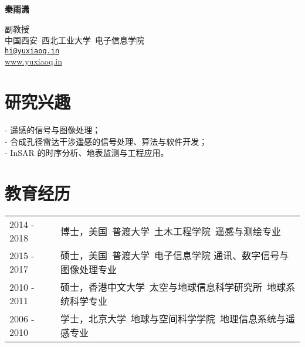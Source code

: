\documentclass[letterpaper]{article}
\def\name{\textbf{秦雨潇}}
\begin{document}
{\huge \name}


\vspace{0.2in}

\begin{minipage}{0.8\linewidth}
	副教授 \\
	中国西安\ 西北工业大学\ 电子信息学院\\
  \href{mailto:hi@yuxiaoq.in}{\tt hi@yuxiaoq.in} \\ 
  \href{www.yuxiaoq.in}{www.yuxiaoq.in}
\end{minipage}


\section*{\textsc{研究兴趣}}
- 遥感的信号与图像处理；\vspace{.5em}\\
- 合成孔径雷达干涉遥感的信号处理、算法与软件开发；\vspace{.5em}\\
- InSAR 的时序分析、地表监测与工程应用。


\section*{\textsc{教育经历}}
\begin{tabular}{ll}
2014 - 2018 & 博士，美国\ 普渡大学\ 土木工程学院\ 遥感与测绘专业\vspace{.5em}\\
2015 - 2017 & 硕士，美国\ 普渡大学\ 电子信息学院 通讯、数字信号与图像处理专业\vspace{.5em}\\
2010 - 2011 & 硕士，香港中文大学\ 太空与地球信息科学研究所\  地球系统科学专业 \vspace{.5em}\\
2006 - 2010 & 学士，北京大学\ 地球与空间科学学院\ 地理信息系统与遥感专业
\end{tabular}
\end{document}
